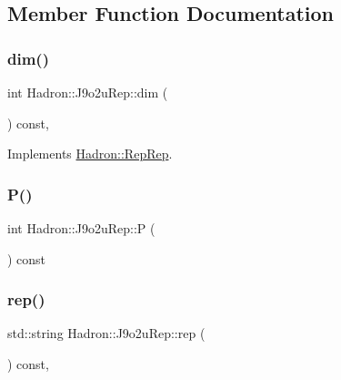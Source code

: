 \subsection{Member Function Documentation}
\mbox{\label{structHadron_1_1J9o2uRep_a8fe53f7193e81fb4681c5adbf89bca09}} 
\subsubsection{\texorpdfstring{dim()}{dim()}}
{\footnotesize\ttfamily int Hadron\+::\+J9o2u\+Rep\+::dim (\begin{DoxyParamCaption}{ }\end{DoxyParamCaption}) const\hspace{0.3cm}{\ttfamily [inline]}, {\ttfamily [virtual]}}



Implements \mbox{\hyperlink{structHadron_1_1RepRep_a92c8802e5ed7afd7da43ccfd5b7cd92b}{Hadron\+::\+Rep\+Rep}}.

\mbox{\label{structHadron_1_1J9o2uRep_a3aebae1f874d8463e884f81517de21a8}} 
\subsubsection{\texorpdfstring{P()}{P()}}
{\footnotesize\ttfamily int Hadron\+::\+J9o2u\+Rep\+::P (\begin{DoxyParamCaption}{ }\end{DoxyParamCaption}) const\hspace{0.3cm}{\ttfamily [inline]}}

\mbox{\label{structHadron_1_1J9o2uRep_ac55275a024a1bfeefef8a2916dcf8a3c}} 
\subsubsection{\texorpdfstring{rep()}{rep()}}
{\footnotesize\ttfamily std\+::string Hadron\+::\+J9o2u\+Rep\+::rep (\begin{DoxyParamCaption}{ }\end{DoxyParamCaption}) const\hspace{0.3cm}{\ttfamily [inline]}, {\ttfamily [virtual]}}



